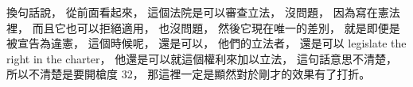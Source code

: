 \hypertarget{w06:cue:978}{}換句話說，
\hypertarget{w06:cue:979}{}從前面看起來，
\hypertarget{w06:cue:980}{}這個法院是可以審查立法，
\hypertarget{w06:cue:981}{}沒問題，
\hypertarget{w06:cue:982}{}因為寫在憲法裡，
\hypertarget{w06:cue:983}{}而且它也可以拒絕適用，
\hypertarget{w06:cue:984}{}也沒問題，
\hypertarget{w06:cue:985}{}然後它現在唯一的差別，
\hypertarget{w06:cue:986}{}就是即便是被宣告為違憲，
\hypertarget{w06:cue:987}{}這個時候呢，
\hypertarget{w06:cue:988}{}還是可以，
\hypertarget{w06:cue:989}{}他們的立法者，
\hypertarget{w06:cue:990}{}還是可以 legislate the right in the charter，
\hypertarget{w06:cue:991}{}他還是可以就這個權利來加以立法，
\hypertarget{w06:cue:992}{}這句話意思不清楚，
\hypertarget{w06:cue:993}{}所以不清楚是要開槍度 32，
\hypertarget{w06:cue:994}{}那這裡一定是顯然對於剛才的效果有了打折。


